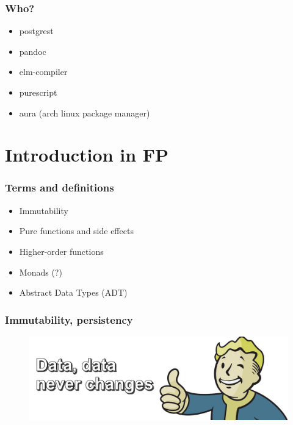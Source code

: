 \documentclass[18pt, compress]{beamer}
\begin{document}
\begin{frame}[fragile]
    \frametitle{Who?}
    \begin{itemize}[label={\MVRightarrow}]
        \item postgrest
        \item pandoc
        \item elm-compiler
        \item purescript
        \item aura (arch linux package manager)
    \end{itemize}
\end{frame}

\fontsize{13pt}{14}\selectfont
\section{Introduction in FP}
\fontsize{17pt}{18}\selectfont

\begin{frame}[fragile]
    \frametitle{Terms and definitions}
    \begin{itemize}[label={\MVRightarrow}]
        \item Immutability
        \item Pure functions and side effects
        \item Higher-order functions
        \item Monads (?)
        \item Abstract Data Types (ADT)
    \end{itemize}
\end{frame}

\begin{frame}
    \frametitle{Immutability, persistency}
    \vspace{-10pt}
    \begin{figure}
        \includegraphics[width=1.1\textwidth,center]{Vault_Boy_text.png}
    \end{figure}
\end{frame}
\end{document}

